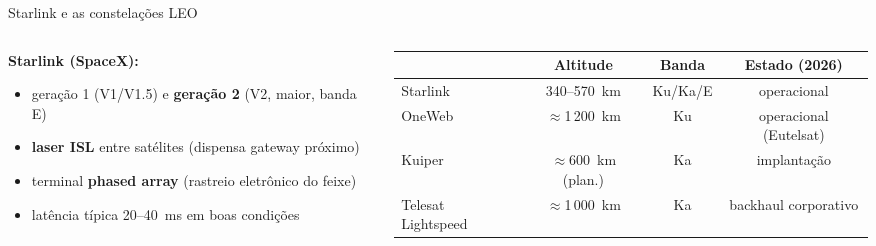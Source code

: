 \documentclass[aspectratio=169,11pt]{beamer}
\begin{document}
\begin{frame}{Starlink e as constelações LEO}
  \begin{columns}
    \begin{column}{0.5\textwidth}
      \textbf{Starlink (SpaceX):}
      \begin{itemize}
        \item geração 1 (V1/V1.5) e \textbf{geração 2} (V2, maior, banda E)
        \item \textbf{laser ISL} entre satélites (dispensa gateway próximo)
        \item terminal \textbf{phased array} (rastreio eletrônico do feixe)
        \item latência típica 20--40~ms em boas condições
      \end{itemize}
    \end{column}
    \begin{column}{0.5\textwidth}
      \begin{center}
        \begin{tabular}{@{}lccc@{}}
          \toprule
          & Altitude & Banda & Estado (2026)\\
          \midrule
          Starlink & 340--570~km & Ku/Ka/E & operacional \\
          OneWeb & $\approx$1\,200~km & Ku & operacional (Eutelsat) \\
          Kuiper & $\approx$600~km (plan.) & Ka & implantação \\
          Telesat Lightspeed & $\approx$1\,000~km & Ka & backhaul corporativo \\
          \bottomrule
        \end{tabular}
      \end{center}
    \end{column}
  \end{columns}
\end{frame}
\end{document}
